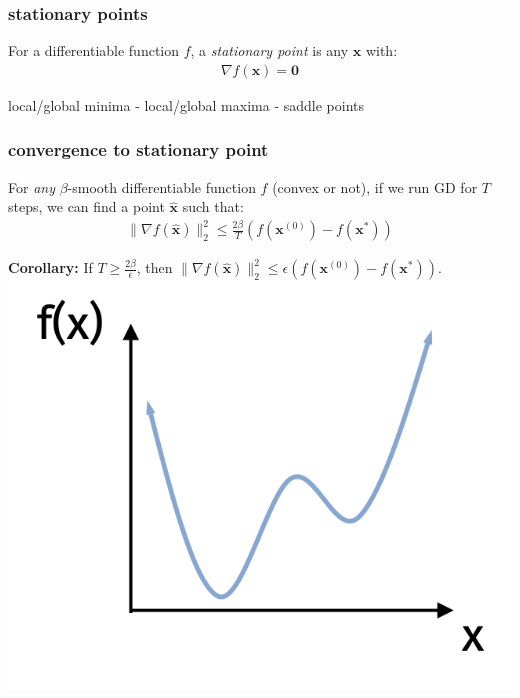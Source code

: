 \documentclass[compress]{beamer}
\newcommand{\bv}[1]{\mathbf{#1}}
\begin{document}
\begin{frame}[t]
	\frametitle{stationary points}
	\begin{definition}
		For a differentiable function $f$, a \emph{stationary point} is any $\bv{x}$ with: 
		\begin{align*}
			\nabla f(\bv{x}) = \bv{0}
		\end{align*}
	\end{definition}
	\begin{center}
		local/global minima - local/global maxima - saddle points
	\end{center}
\end{frame}

\begin{frame}[t]
	\frametitle{convergence to stationary point}
	\begin{theorem}
	For \emph{any} $\beta$-smooth differentiable function $f$ (convex or not), if we run GD for $T$ steps, we can find a point $\hat{\bv{x}}$ such that:
	\begin{align*}
		\|\nabla f(\hat{\bv{x}})\|_2^2 \leq  \frac{2\beta}{T} \left( f(\bv{x}^{(0)}) -  f(\bv{x}^{*})\right)
	\end{align*} 
\end{theorem}
\textbf{Corollary:} If $T \geq \frac{2\beta}{\epsilon}$, then $\|\nabla f(\hat{\bv{x}})\|_2^2 \leq \epsilon  \left( f(\bv{x}^{(0)}) -  f(\bv{x}^{*})\right)$.
\includegraphics[width=.4\textwidth]{simple_non_convex.png}
\end{frame}
\end{document}
